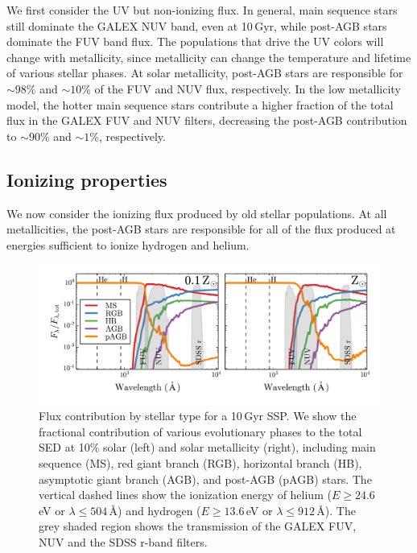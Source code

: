 \documentclass[preprint2]{aastex62}
\newcommand{\ang}{\ensuremath{\mbox{\AA}}\xspace}
\newcommand{\Gyr}{$\,$Gyr\xspace}
\begin{document}
We first consider the UV but non-ionizing flux. In general, main sequence stars still dominate the GALEX NUV band, even at 10\Gyr, while post-AGB stars dominate the FUV band flux. The populations that drive the UV colors will change with metallicity, since metallicity can change the temperature and lifetime of various stellar phases. At solar metallicity, post-AGB stars are responsible for $\sim98\%$ and $\sim10\%$ of the FUV and NUV flux, respectively. In the low metallicity model, the hotter main sequence stars contribute a higher fraction of the total flux in the GALEX FUV and NUV filters, decreasing the post-AGB contribution to $\sim90\%$ and $\sim1\%$, respectively. %

\subsection{Ionizing properties}\label{sec:stars:ion}

We now consider the ionizing flux produced by old stellar populations. At all metallicities, the post-AGB stars are responsible for all of the flux produced at energies sufficient to ionize hydrogen and helium. 

\begin{figure}
  \begin{center}
    \includegraphics[width=\linewidth]{figs/f2.png}
    \caption{{\sc Flux contribution by stellar type for a 10\,Gyr SSP.} We show the fractional contribution of various evolutionary phases to the total SED at 10\% solar (left) and solar metallicity (right), including main sequence (MS), red giant branch (RGB), horizontal branch (HB), asymptotic giant branch (AGB), and post-AGB (pAGB) stars. The vertical dashed lines show the ionization energy of helium ($E\geq24.6\,$eV or $\lambda \leq 504\,$\ang) and hydrogen ($E\geq13.6\,$eV or $\lambda \leq 912\,$\ang). The grey shaded region shows the transmission of the GALEX FUV, NUV and the SDSS r-band filters.}
    \label{fig:FracSpec}
  \end{center}
\end{figure}
\end{document}
